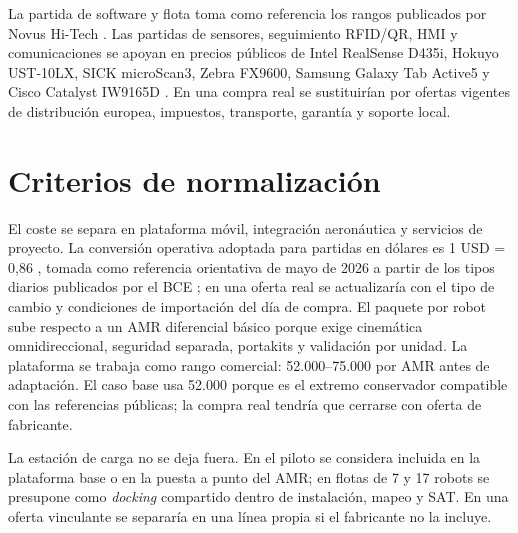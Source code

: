 La partida de software y flota toma como referencia los rangos publicados por Novus Hi-Tech \cite{novusAmrCostGuide}. Las partidas de sensores, seguimiento RFID/QR, HMI y comunicaciones se apoyan en precios públicos de Intel RealSense D435i, Hokuyo UST-10LX, SICK microScan3, Zebra FX9600, Samsung Galaxy Tab Active5 y Cisco Catalyst IW9165D \cite{intelD435i,hokuyoUst10lx,sickMicroscan3,zebraFx9600,samsungTabActive5,ciscoIw9165d}. En una compra real se sustituirían por ofertas vigentes de distribución europea, impuestos, transporte, garantía y soporte local.

\section{Criterios de normalización}

El coste se separa en plataforma móvil, integración aeronáutica y servicios de proyecto. La conversión operativa adoptada para partidas en dólares es 1 USD = 0,86 \texteuro{}, tomada como referencia orientativa de mayo de 2026 a partir de los tipos diarios publicados por el BCE \cite{ecbReferenceRates}; en una oferta real se actualizaría con el tipo de cambio y condiciones de importación del día de compra. El paquete por robot sube respecto a un AMR diferencial básico porque exige cinemática omnidireccional, seguridad separada, portakits y validación por unidad. La plataforma se trabaja como rango comercial: 52.000--75.000 \texteuro{} por AMR antes de adaptación. El caso base usa 52.000 \texteuro{} porque es el extremo conservador compatible con las referencias públicas; la compra real tendría que cerrarse con oferta de fabricante.

La estación de carga no se deja fuera. En el piloto se considera incluida en la plataforma base o en la puesta a punto del AMR; en flotas de 7 y 17 robots se presupone como \textit{docking} compartido dentro de instalación, mapeo y SAT. En una oferta vinculante se separaría en una línea propia si el fabricante no la incluye.

